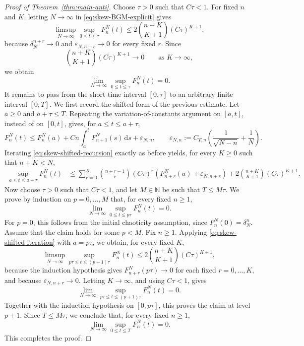 \documentclass[10pt,a4paper,reqno]{amsart}
\numberwithin{equation}{section}
\theoremstyle{plain}
\theoremstyle{definition}
\theoremstyle{remark}
\renewcommand{\d}{\mathrm d}
\newcommand{\1}{\mathbf 1}
\begin{document}
\begin{proof}[Proof of Theorem~\ref{thm:main-anti}]
Choose \(\tau>0\) such that \(C\tau<1\). For fixed \(n\) and \(K\), letting \(N\to\infty\) in \eqref{eq:skew-BGM-explicit} gives
\[
  \limsup_{N\to\infty}
  \sup_{0\le t\le\tau}
  F_n^N(t)
  \le
  2\binom{n+K}{K+1}(C\tau)^{K+1},
\]
because \(\delta_N^{n+r}\to0\) and \(\varepsilon_{N,n+r}\to0\) for every fixed \(r\). Since
\[
  \binom{n+K}{K+1}(C\tau)^{K+1}\longrightarrow0
  \qquad\mbox{as }K\to\infty,
\]
we obtain
\[
  \lim_{N\to\infty}
  \sup_{0\le t\le\tau}
  F_n^N(t)=0.
\]
It remains to pass from the short time interval \([0,\tau]\) to an arbitrary finite interval \([0,T]\). We first record the shifted form of the previous estimate. Let \(a\ge0\) and \(a+\tau\le T\). Repeating the variation-of-constants argument on \([a,t]\), instead of on \([0,t]\), gives, for \(a\le t\le a+\tau\),
\begin{equation}
  F_n^N(t)\le F_n^N(a)+Cn\int_a^tF_{n+1}^N(s)\,\d s+\varepsilon_{N,n},
  \qquad
  \varepsilon_{N,n}:=C_{T,n}\left(\frac1{\sqrt{N-n}}+\frac1N\right).
  \label{eq:skew-shifted-recursion}
\end{equation}
Iterating \eqref{eq:skew-shifted-recursion} exactly as before yields, for every \(K\ge0\) such that \(n+K<N\),
\begin{equation}
\begin{aligned}
  \sup_{a\le t\le a+\tau}F_n^N(t)
  &\le
  \sum_{r=0}^K
  \binom{n+r-1}{r}
  (C\tau)^r
  \left(
    F_{n+r}^N(a)
    +
    \varepsilon_{N,n+r}
  \right)
  +
  2\binom{n+K}{K+1}(C\tau)^{K+1}.
\end{aligned}
  \label{eq:skew-shifted-iteration}
\end{equation}
Now choose \(\tau>0\) such that \(C\tau<1\), and let \(M\in\mathbb N\) be such that \(T\le M\tau\). We prove by induction on \(p=0,\ldots,M\) that, for every fixed \(n\ge1\),
\[
  \lim_{N\to\infty}
  \sup_{0\le t\le p\tau}
  F_n^N(t)
  =
  0.
\]
For \(p=0\), this follows from the initial chaoticity assumption, since \(F_n^N(0)=\delta_N^n\). Assume that the claim holds for some \(p<M\). Fix \(n\ge1\). Applying \eqref{eq:skew-shifted-iteration} with \(a=p\tau\), we obtain, for every fixed \(K\),
\[
  \limsup_{N\to\infty}
  \sup_{p\tau\le t\le(p+1)\tau}
  F_n^N(t)
  \le
  2\binom{n+K}{K+1}(C\tau)^{K+1},
\]
because the induction hypothesis gives \(F_{n+r}^N(p\tau)\to0\) for each fixed \(r=0,\ldots,K\), and because \(\varepsilon_{N,n+r}\to0\). Letting \(K\to\infty\), and using \(C\tau<1\), gives
\[
  \lim_{N\to\infty}
  \sup_{p\tau\le t\le(p+1)\tau}
  F_n^N(t)
  =
  0.
\]
Together with the induction hypothesis on \([0,p\tau]\), this proves the claim at level \(p+1\). Since \(T\le M\tau\), we conclude that, for every fixed \(n\ge1\),
\[
  \lim_{N\to\infty}
  \sup_{0\le t\le T}
  F_n^N(t)
  =
  0.
\]
This completes the proof.
\end{proof}
\end{document}
